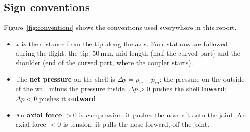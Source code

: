 \subsection{Sign conventions}

Figure~\ref{fig:conventions} shows the conventions used everywhere in this report.
\begin{itemize}
\item $x$ is the distance from the tip along the axis. Four stations are followed during the flight:
the tip, 50\,mm, mid-length (half the curved part) and the shoulder (end of the curved part, where the
coupler starts).
\item The \textbf{net pressure} on the shell is $\Delta p = p_w - p_{in}$: the pressure on the outside of
the wall minus the pressure inside. $\Delta p > 0$ pushes the shell \textbf{inward}; $\Delta p < 0$ pushes
it \textbf{outward}.
\item An \textbf{axial force} $> 0$ is compression: it pushes the nose aft onto the joint. An axial
force $< 0$ is tension: it pulls the nose forward, off the joint.
\end{itemize}

